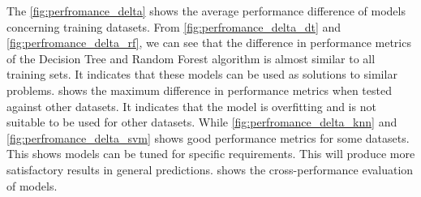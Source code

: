 The \cref{fig:perfromance_delta} shows the average performance difference of models concerning training datasets. From \cref{fig:perfromance_delta_dt} and \cref{fig:perfromance_delta_rf}, we can see that the difference in performance metrics of the Decision Tree and Random Forest algorithm is almost similar to all training sets. It indicates that these models can be used as solutions to similar problems.  shows the maximum difference in performance metrics when tested against other datasets. It indicates that the model is overfitting and is not suitable to be used for other datasets. While \cref{fig:perfromance_delta_knn} and \cref{fig:perfromance_delta_svm} shows good performance metrics for some datasets. This shows models can be tuned for specific requirements. This will produce more satisfactory results in general predictions.  shows the cross-performance evaluation of models.

